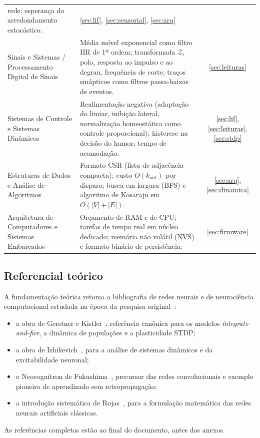 \documentclass[11pt,a4paper]{article}
\begin{document}
\begin{center}
\begin{longtable}{@{}>{\raggedright\arraybackslash}p{3.7cm}>{\raggedright\arraybackslash}p{10.4cm}c@{}}
  rede; esperança do arredondamento estocástico. & \ref{sec:lif}, \ref{sec:sensorial}, \ref{sec:arq} \\
Sinais e Sistemas / Processamento Digital de Sinais & Média móvel exponencial como filtro IIR de 1ª ordem; transformada $\mathcal{Z}$,
  polo, resposta ao impulso e ao degrau, frequência de corte; traços sinápticos como filtros passa-baixas de eventos. & \ref{sec:leituras} \\
Sistemas de Controle e Sistemas Dinâmicos & Realimentação negativa (adaptação do limiar, inibição lateral, normalização
  homeostática como controle proporcional); histerese na decisão do humor; tempo de acomodação. & \ref{sec:lif}, \ref{sec:leituras}, \ref{sec:stdp} \\
Estruturas de Dados e Análise de Algoritmos & Formato CSR (lista de adjacência compacta); custo $O(k_\text{out})$ por disparo;
  busca em largura (BFS) e algoritmo de Kosaraju em $O(|V|+|E|)$. & \ref{sec:arq}, \ref{sec:dinamica} \\
Arquitetura de Computadores e Sistemas Embarcados & Orçamento de RAM e de CPU; tarefas de tempo real em núcleo dedicado; memória
  não volátil (NVS) e formato binário de persistência. & \ref{sec:firmware} \\
\bottomrule
\end{longtable}
\end{center}

\subsection*{Referencial teórico}

A fundamentação teórica retoma a bibliografia de redes neurais e de neurociência computacional estudada na época da pesquisa
original~\cite{santos2012}:
\begin{itemize}
  \item a obra de Gerstner e Kistler~\cite{gerstner2002}, referência canônica para os modelos \emph{integrate-and-fire}, a
        dinâmica de populações e a plasticidade STDP;
  \item a obra de Izhikevich~\cite{izhikevich2007}, para a análise de sistemas dinâmicos e da excitabilidade neuronal;
  \item o Neocognitron de Fukushima~\cite{fukushima1980}, precursor das redes convolucionais e exemplo pioneiro de aprendizado sem
        retropropagação;
  \item a introdução sistemática de Rojas~\cite{rojas1996}, para a formulação matemática das redes neurais artificiais clássicas.
\end{itemize}
As referências completas estão ao final do documento, antes dos anexos.
\end{document}
